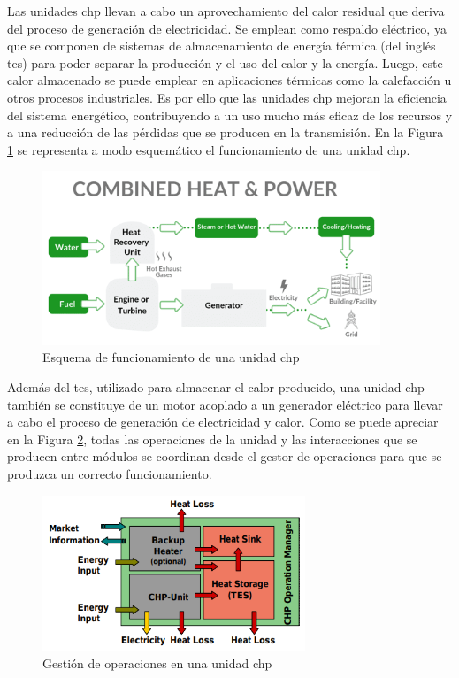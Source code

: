Las unidades \gls{chp} \cite{chp} llevan a cabo un aprovechamiento del calor residual que deriva del proceso de generación de electricidad. Se emplean como respaldo eléctrico, ya que se componen de sistemas de almacenamiento de energía térmica (del inglés \gls{tes}) para poder separar la producción y el uso del calor y la energía. Luego, este calor almacenado se puede emplear en aplicaciones térmicas como la calefacción u otros procesos industriales. Es por ello que las unidades \gls{chp} mejoran la eficiencia del sistema energético, contribuyendo a un uso mucho más eficaz de los recursos y a una reducción de las pérdidas que se producen en la transmisión. En la Figura \ref{fig:chp} se representa a modo esquemático el funcionamiento de una unidad \gls{chp}. \cite{chp2}

\vspace{3mm}

\begin{figure}[h]
  \centering
  \includegraphics[width=0.9\textwidth]{img/teoria/chp.png}
  \caption{Esquema de funcionamiento de una unidad \gls{chp} \cite{chp}}
  \label{fig:chp}
\end{figure}

\vspace{3mm}

Además del \gls{tes}, utilizado para almacenar el calor producido, una unidad \gls{chp} también se constituye de un motor acoplado a un generador eléctrico para llevar a cabo el proceso de generación de electricidad y calor. Como se puede apreciar en la Figura \ref{fig:chp2}, todas las operaciones de la unidad y las interacciones que se producen entre módulos se coordinan desde el gestor de operaciones para que se produzca un correcto funcionamiento.

\vspace{3mm}

\begin{figure}[h]
  \centering
  \includegraphics[width=0.7\textwidth]{img/teoria/chp2.png}
  \caption{Gestión de operaciones en una unidad \gls{chp} \cite{chp2}}
  \label{fig:chp2}
\end{figure}

